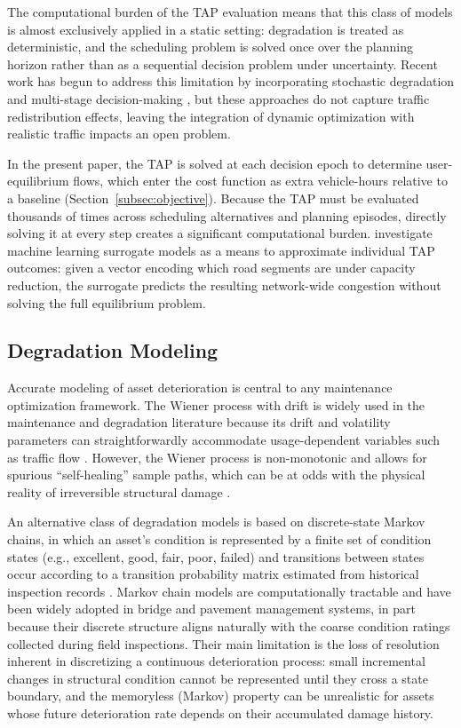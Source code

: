 \documentclass[3p, twocolumn]{elsarticle}
\begin{document}
The computational burden of the TAP evaluation means that this class of models is almost exclusively applied in a static setting: degradation is treated as deterministic, and the scheduling problem is solved once over the planning horizon rather than as a sequential decision problem under uncertainty. Recent work has begun to address this limitation by incorporating stochastic degradation and multi-stage decision-making \citep{andriotis_managing_2019, vanremmerdenDeepMultiobjectiveReinforcement2025}, but these approaches do not capture traffic redistribution effects, leaving the integration of dynamic optimization with realistic traffic impacts an open problem.

In the present paper, the TAP is solved at each decision epoch to determine user-equilibrium flows, which enter the cost function as extra vehicle-hours relative to a baseline (Section~\ref{subsec:objective}). Because the TAP must be evaluated thousands of times across scheduling alternatives and planning episodes, directly solving it at every step creates a significant computational burden. \citet{boschMachineLearningPredictions2025} investigate machine learning surrogate models as a means to approximate individual TAP outcomes: given a vector encoding which road segments are under capacity reduction, the surrogate predicts the resulting network-wide congestion without solving the full equilibrium problem.

\subsection{Degradation Modeling}

Accurate modeling of asset deterioration is central to any maintenance optimization framework. The Wiener process with drift is widely used in the maintenance and degradation literature because its drift and volatility parameters can straightforwardly accommodate usage-dependent variables such as traffic flow \citep{van_noortwijk_survey_2009}. However, the Wiener process is non-monotonic and allows for spurious ``self-healing'' sample paths, which can be at odds with the physical reality of irreversible structural damage \citep{zhangOptimalConditionbasedMaintenance2024}.

An alternative class of degradation models is based on discrete-state Markov chains, in which an asset's condition is represented by a finite set of condition states (e.g., excellent, good, fair, poor, failed) and transitions between states occur according to a transition probability matrix estimated from historical inspection records \citep{frangopol_probabilistic_2004}. Markov chain models are computationally tractable and have been widely adopted in bridge and pavement management systems, in part because their discrete structure aligns naturally with the coarse condition ratings collected during field inspections. Their main limitation is the loss of resolution inherent in discretizing a continuous deterioration process: small incremental changes in structural condition cannot be represented until they cross a state boundary, and the memoryless (Markov) property can be unrealistic for assets whose future deterioration rate depends on their accumulated damage history.
\end{document}
